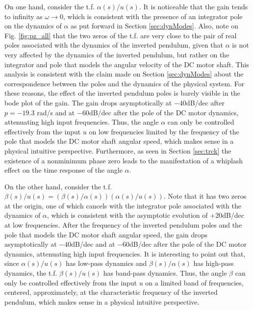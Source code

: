 \documentclass[letterpaper, 10 pt, conference]{ieeeconf}
\begin{document}
On one hand, consider the t.f. $\alpha(s)/u(s)$. It is noticeable that the gain tends to infinity as $\omega\rightarrow 0$, which is consistent with the presence of an integrator pole on the dynamics of $\alpha$ as put forward in Section \ref{sec:dynModes}. Also, note on Fig. \ref{fig:pz_all} that the two zeros of the t.f. are very close to the pair of real poles associated with the dynamics of the inverted pendulum, given that $\alpha$ is not very affected by the dynamics of the inverted pendulum, but rather on the integrator and pole that models the angular velocity of the DC motor shaft. This analysis is consistent with the claim made on Section \ref{sec:dynModes} about the correspondence between the poles and the dynamics of the physical system. For these reasons, the effect of the inverted pendulum poles is barely visible in the bode plot of the gain. The gain drops asymptotically at $-40$dB/dec after $p = -19.3$ rad/s and at $-60$dB/dec after the pole of the DC motor dynamics, attenuating high input frequencies. Thus, the angle $\alpha$ can only be controlled effectively from the input $u$ on low frequencies limited by the frequency of the pole that models the DC motor shaft angular speed, which makes sense in a physical intuitive perspective. Furthermore, as seen in Section \ref{sec:trck} the existence of a nonminimum phase zero leads to the manifestation of a whiplash effect on the time response of the angle $\alpha$. 

On the other hand, consider the t.f. $\beta(s)/u(s) = (\beta(s)/\alpha(s)) (\alpha(s)/u(s))$. Note that it has two zeros at the origin, one of which cancels with the integrator pole associated with the dynamics of $\alpha$, which is consistent with the asymptotic evolution of $+20$dB/dec at low frequencies. After the frequency of the inverted pendulum poles and the pole that models the DC motor shaft angular speed, the gain drops asymptotically at $-40$dB/dec and at $-60$dB/dec after the pole of the DC motor dynamics, attenuating high input frequencies. It is interesting to point out that, since $\alpha(s)/u(s)$ has low-pass dynamics and $\beta(s)/\alpha(s)$ has high-pass dynamics, the t.f. $\beta(s)/u(s)$ has band-pass dynamics. Thus, the angle $\beta$ can only be controlled effectively from the input $u$ on a limited band of frequencies, centered, approximately, at the characteristic frequency of the inverted pendulum, which makes sense in a physical intuitive perspective.
\end{document}
